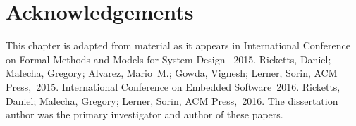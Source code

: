 \section{Acknowledgements}
This chapter is adapted from material as it appears in International
Conference on Formal Methods and Models for System Design ~2015.  Ricketts,
Daniel; Malecha, Gregory; Alvarez, Mario~M.; Gowda, Vignesh; Lerner, Sorin,
ACM Press,~2015. International Conference on Embedded Software~2016.
Ricketts, Daniel; Malecha, Gregory; Lerner, Sorin, ACM Press,~2016. The
dissertation author was the primary investigator and author of these
papers.
